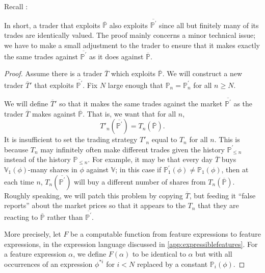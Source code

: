 \documentclass[authordate,onecolumn,noenvironments]{miri-tech-article}
\numberwithin{equation}{subsection}
\newcommand{\seq}[1]{{\overline{#1}}}
\newcommand{\nn}{n}
\newcommand{\trade}{T}%
\newcommand{\Trader}{\seq{\trade}} %
\newcommand{\BelState}{\mathbb{P}}
\newcommand{\Valuation}{\mathbb{V}}
\newcommand{\pt}{\BelState}
\newcommand{\MP}{\seq{\pt}}
\begin{document}
Recall :

\ifp*

In short, a trader that exploits $\MP$ also exploits ${\seq{\pt^\prime}}$ since all but finitely many of its trades are identically valued. 
The proof mainly concerns a minor technical issue; we have to make a small adjustment to the trader to ensure that it makes exactly the same
trades against ${\seq{\pt^\prime}}$ as it does against $\MP$. 


\begin{proof}
  Assume there is a trader $\Trader$ which exploits $\MP$. We will construct a new trader $\Trader'$ that exploits ${\seq{\pt^\prime}}$. Fix $N$ large enough that $ \pt_\nn= \pt^\prime_\nn$ for all $\nn\geq N$. 

We will define $\Trader'$ so that it makes the same trades against the market ${\seq{\pt^\prime}}$ as the trader $\Trader$ makes against $\MP$.   That is, we want that for
all $n$, 
%
\[
  \trade'_n({\seq{\pt^\prime}}) =\trade_n(\MP).  
\]
%
It is insufficient to set the trading strategy $\trade'_n$ 
equal to $\trade_n$ for all $n$.  This is because $\trade_n$ may infinitely often make different trades given the history $\pt^\prime_{\leq n}$ instead of
the history 
$\pt_{\leq n}$. For example, it may be that every day $\Trader$ buys $\Valuation_1(\phi)$-many shares in $\phi$ against $\Valuation$; in this case if
$\pt^\prime_1(\phi) \ne \pt_1(\phi)$, then at each time $n$, 
$\trade_n({\seq{\pt^\prime}})$ will buy a different number of shares from $\trade_n(\MP)$. Roughly speaking, we will patch this problem by copying $\Trader$, but feeding it
``false reports'' about the market prices so that it appears to the $\trade_n$ that they are reacting to $\MP$ rather than ${\seq{\pt^\prime}}$.

More precisely, let $F$ be a computable function from feature expressions to feature expressions, 
in the expression language discussed in \ref{app:expressiblefeatures}. For a feature expression $\alpha$, we define $F(\alpha
)$ to be identical to $\alpha$ but with all occurrences of an expression $\phi^{* i}$ for $i<N$ replaced by a constant $\pt_i(\phi)$.


\end{proof}
\end{document}
